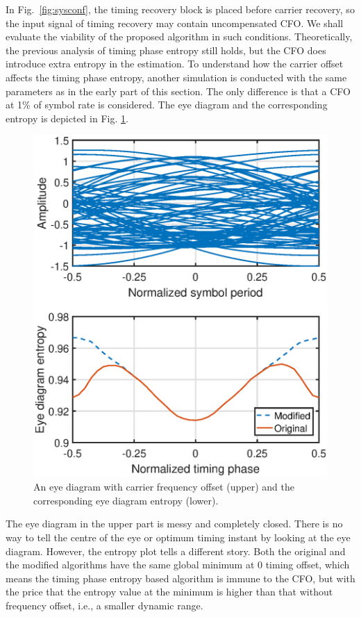 \documentclass[journal,comsoc]{IEEEtran}
\begin{document}
In Fig.~\ref{fig:sysconf}, the timing recovery block is placed before carrier recovery, so the input signal of timing recovery may contain uncompensated CFO.
We shall evaluate the viability of the proposed algorithm in such conditions. 
Theoretically, the previous analysis of timing phase entropy still holds, but the CFO does introduce extra entropy in the estimation.
To understand how the carrier offset affects the timing phase entropy, another simulation is conducted with the same parameters as in the early part of this section.
The only difference is that a CFO at 1\% of symbol rate is considered.
The eye diagram and the corresponding entropy is depicted in Fig. \ref{fig:timing_freq}.
      
\begin{figure}[ht]
\centering
\includegraphics[width=3 in]{pic/timing_freq.eps}
\caption{An eye diagram with carrier frequency offset (upper) and the corresponding eye diagram entropy (lower).}
\label{fig:timing_freq} 
\end{figure}

The eye diagram in the upper part is messy and completely closed. 
There is no way to tell the centre of the eye or optimum timing instant by looking at the eye diagram.
However, the entropy plot tells a different story.
Both the original and the modified algorithms have the same global minimum at 0 timing offset, which means the timing phase entropy based algorithm is immune to the CFO,
but with the price that the entropy value at the minimum is higher than that without frequency offset, i.e., a smaller dynamic range.
\end{document}
